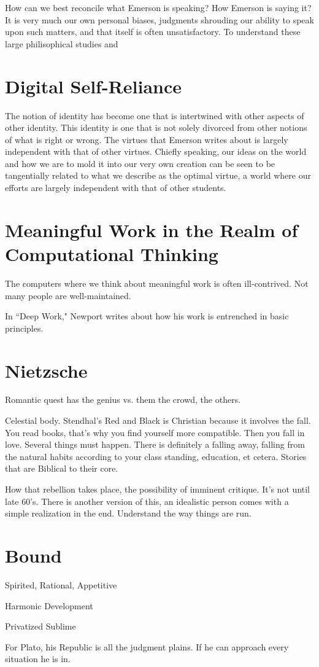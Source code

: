 \documentclass[12pt,letterpaper]{article}
\begin{document}
How can we best reconcile what Emerson is speaking?  How
Emerson is saying it?  It is very much our own personal
biases, judgments shrouding our ability to speak upon such
matters, and that itself is often unsatisfactory.  To
understand these large philisophical studies and 

\section{Digital Self-Reliance}

The notion of identity has become one that is intertwined with other aspects of other identity.  This identity is one that is not solely divorced from other notions of what is right or wrong.  The virtues that Emerson writes about is largely independent with that of other virtues.  Chiefly speaking, our ideas on the world and how we are to mold it into our very own creation can be seen to be tangentially related to what we describe as the optimal virtue, a world where our efforts are largely independent with that of other students.

\section{Meaningful Work in the Realm of Computational Thinking}
The computers where we think about meaningful work is often ill-contrived.  Not many people are well-maintained. 

In ``Deep Work," Newport writes about how his work is entrenched in basic principles.


\section{Nietzsche}

Romantic quest has the genius vs. them the crowd, the others.

Celestial body.  Stendhal's Red and Black is Christian because it involves the fall.  You read books, that's why you find yourself more compatible.  Then you fall in love.  Several things must happen.  There is definitely a falling away, falling from the natural habits according to your class standing, education, et cetera.  Stories that are Biblical to their core.

How that rebellion takes place, the possibility of imminent critique.  It's not until late 60's.  There is another version of this, an idealistic person comes with a simple realization in the end.  Understand the way things are run.

\section{Bound}

Spirited, Rational, Appetitive

Harmonic Development

Privatized Sublime

For Plato, his Republic is all the judgment plains.  If he can approach every situation he is in.  
\end{document}
